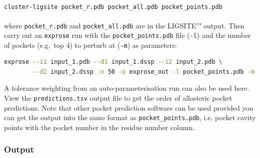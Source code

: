 \begin{lstlisting}[language=bash]
    cluster-ligsite pocket_r.pdb pocket_all.pdb pocket_points.pdb
\end{lstlisting}

where \verb|pocket_r.pdb| and \verb|pocket_all.pdb| are in the LIGSITE\textsuperscript{\it cs} output. Then carry out an \verb|exprose| run with the \verb|pocket_points.pdb| file (\verb|-l|) and the number of pockets (e.g.\ top 4) to perturb at (\verb|-m|) as parameters:

\begin{lstlisting}[language=bash]
    exprose --i1 input_1.pdb --d1 input_1.dssp --i2 input_2.pdb \
        --d2 input_2.dssp -n 50 -o exprose_out -l pocket_points.pdb -m 4
\end{lstlisting}

A tolerance weighting from an auto-parameterisation run can also be used here. View the \verb|predictions.tsv| output file to get the order of allosteric pocket predictions. Note that other pocket prediction software can be used provided you can get the output into the same format as \verb|pocket_points.pdb|, i.e. pocket cavity points with the pocket number in the residue number column.


\subsubsection{Output}

